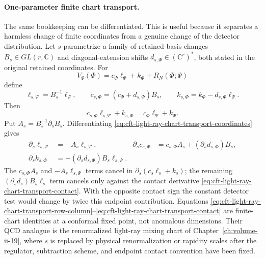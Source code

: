 \paragraph{One-parameter finite chart transport.}
The same bookkeeping can be differentiated.  This is useful because it
separates a harmless change of finite coordinates from a genuine change of the
detector distribution.  Let \(s\) parametrize a family of retained-basis
changes \(B_s\in GL(r,\mathbb C)\) and diagonal-extension shifts
\(d_{s,\Phi}\in(\mathbb C^r)^*\), both stated in the original retained
coordinates.  For
\[
  V_\Psi(\Phi)=c_\Phi\ell_\Psi+k_\Phi+R_N(\Phi;\Psi)
\]
define
\begin{equation}
  \ell_{s,\Psi}=B_s^{-1}\ell_\Psi,\qquad
  c_{s,\Phi}=(c_\Phi+d_{s,\Phi})B_s,\qquad
  k_{s,\Phi}=k_\Phi-d_{s,\Phi}\ell_\Psi .
  \label{eq:cft-light-ray-chart-transport-coordinates}
\end{equation}
Then
\[
  c_{s,\Phi}\ell_{s,\Psi}+k_{s,\Phi}
  =
  c_\Phi\ell_\Psi+k_\Phi .
\]
Put \(A_s=B_s^{-1}\partial_sB_s\).  Differentiating
\eqref{eq:cft-light-ray-chart-transport-coordinates} gives
\begin{align}
  \partial_s\ell_{s,\Psi}
  &=
  -A_s\ell_{s,\Psi},&
  \partial_sc_{s,\Phi}
  &=
  c_{s,\Phi}A_s+(\partial_sd_{s,\Phi})B_s,
  \label{eq:cft-light-ray-chart-transport-row-column}\\
  \partial_sk_{s,\Phi}
  &=
  -(\partial_sd_{s,\Phi})B_s\ell_{s,\Psi}.
  \label{eq:cft-light-ray-chart-transport-contact}
\end{align}
The \(c_{s,\Phi}A_s\) and \(-A_s\ell_{s,\Psi}\) terms cancel in
\(\partial_s(c_s\ell_s+k_s)\); the remaining
\((\partial_sd_s)B_s\ell_s\) term cancels only against the contact derivative
\eqref{eq:cft-light-ray-chart-transport-contact}.  With the opposite contact
sign the constant detector test would change by twice this endpoint
contribution.  Equations
\eqref{eq:cft-light-ray-chart-transport-row-column}--\eqref{eq:cft-light-ray-chart-transport-contact}
are finite-chart identities at a conformal fixed point, not anomalous
dimensions.  Their QCD analogue is the renormalized light-ray mixing chart of
Chapter~\ref{ch:volume-ii-19}, where \(s\) is replaced by physical
renormalization or rapidity scales after the regulator, subtraction scheme,
and endpoint contact convention have been fixed.

